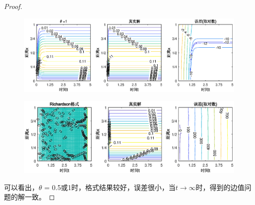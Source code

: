 \documentclass{article}%
\begin{document}
\begin{proof}
\begin{figure}[H]
	\includegraphics[width=1\linewidth]{week12_2_3.eps}
	\label{Fig:2.3}
\end{figure}

\begin{figure}[H]
	\includegraphics[width=1\linewidth]{week12_2_4.eps}
	\label{Fig:2.4}
\end{figure}

可以看出，$\theta$ = 0.5或1时，格式结果较好，误差很小，当$t\rightarrow \infty $时，得到的边值问题的解一致。
\end{proof}
\end{document}
